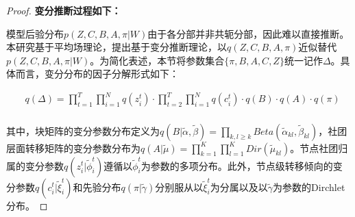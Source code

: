 \begin{proof}
	\textbf{变分推断过程如下：}
	
	模型后验分布$p(Z, C, B, A, \pi | W)$由于各分部并非共轭分部，因此难以直接推断。本研究基于平均场理论，提出基于变分推断理论，以$q(Z, C, B, A, \pi)$近似替代$p(Z, C, B, A, \pi | W)$。为简化表述，本节将参数集合$\{\pi, B, A, C, Z\}$统一记作$\Delta$。具体而言，变分分布的因子分解形式如下：
	
	\begin{equation}
		\label{appendix:eq2}
		\begin{split}
			& q(\Delta) = \prod_{t=1}^T \prod_{i=1}^N q(z_i^t) \cdot \prod_{t=2}^T \prod_{i=1}^N q(c_i^t) \cdot q(B) \cdot q(A) \cdot q(\pi) \\
		\end{split}
	\end{equation}
	
	其中，块矩阵的变分参数分布定义为$q(B | \widetilde{\alpha}, \widetilde{\beta}) = \prod_{k,l \geq k} Beta(\widetilde{\alpha}_{kl}, \widetilde{\beta}_{kl})$，社团层面转移矩阵的变分参数分布为$q(A | \widetilde{\mu}) = \prod_{k=1}^K \prod_{l=1}^K Dir(\widetilde{\mu}_{kl})$。节点社团归属的变分参数$q(z_i^t | \widetilde{\phi}_i^t)$遵循以$\widetilde{\phi}_i^t$为参数的多项分布。此外，节点级转移倾向的变分参数$q(c_i^t | \widetilde{\xi}_i^t)$和先验分布$q(\pi | \widetilde{\gamma})$分别服从以$\widetilde{\xi}_i^t$为分属以及以$\widetilde{\gamma}$为参数的Dirchlet分布。
	
	
	
	

\end{proof}
